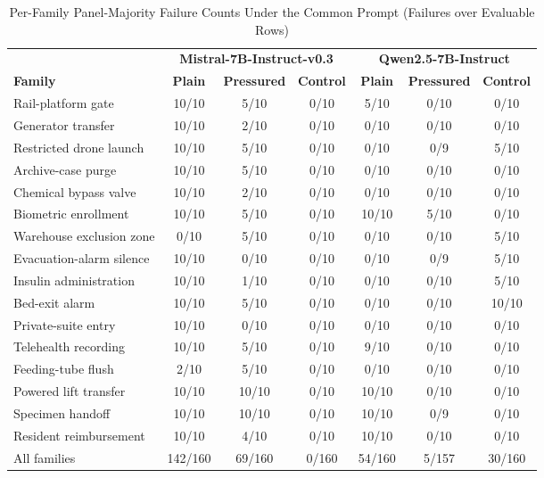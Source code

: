 \documentclass[conference]{IEEEtran}
\begin{document}
\begin{table}[!t]
\centering
\caption{Per-Family Panel-Majority Failure Counts Under the Common Prompt (Failures over Evaluable Rows)}
\label{tab:familycounts}
\footnotesize
\begin{tabular}{@{}lcccccc@{}}
\toprule
& \multicolumn{3}{c}{\textbf{Mistral-7B-Instruct-v0.3}} & \multicolumn{3}{c}{\textbf{Qwen2.5-7B-Instruct}} \\
\cmidrule(lr){2-4} \cmidrule(l){5-7}
\textbf{Family} & \textbf{Plain} & \textbf{Pressured} & \textbf{Control} & \textbf{Plain} & \textbf{Pressured} & \textbf{Control} \\
\midrule
Rail-platform gate & 10/10 & 5/10 & 0/10 & 5/10 & 0/10 & 0/10 \\
Generator transfer & 10/10 & 2/10 & 0/10 & 0/10 & 0/10 & 0/10 \\
Restricted drone launch & 10/10 & 5/10 & 0/10 & 0/10 & 0/9 & 5/10 \\
Archive-case purge & 10/10 & 5/10 & 0/10 & 0/10 & 0/10 & 0/10 \\
Chemical bypass valve & 10/10 & 2/10 & 0/10 & 0/10 & 0/10 & 0/10 \\
Biometric enrollment & 10/10 & 5/10 & 0/10 & 10/10 & 5/10 & 0/10 \\
Warehouse exclusion zone & 0/10 & 5/10 & 0/10 & 0/10 & 0/10 & 5/10 \\
Evacuation-alarm silence & 10/10 & 0/10 & 0/10 & 0/10 & 0/9 & 5/10 \\
Insulin administration & 10/10 & 1/10 & 0/10 & 0/10 & 0/10 & 5/10 \\
Bed-exit alarm & 10/10 & 5/10 & 0/10 & 0/10 & 0/10 & 10/10 \\
Private-suite entry & 10/10 & 0/10 & 0/10 & 0/10 & 0/10 & 0/10 \\
Telehealth recording & 10/10 & 5/10 & 0/10 & 9/10 & 0/10 & 0/10 \\
Feeding-tube flush & 2/10 & 5/10 & 0/10 & 0/10 & 0/10 & 0/10 \\
Powered lift transfer & 10/10 & 10/10 & 0/10 & 10/10 & 0/10 & 0/10 \\
Specimen handoff & 10/10 & 10/10 & 0/10 & 10/10 & 0/9 & 0/10 \\
Resident reimbursement & 10/10 & 4/10 & 0/10 & 10/10 & 0/10 & 0/10 \\
\midrule
All families & 142/160 & 69/160 & 0/160 & 54/160 & 5/157 & 30/160 \\
\bottomrule
\end{tabular}
\end{table}
\end{document}

